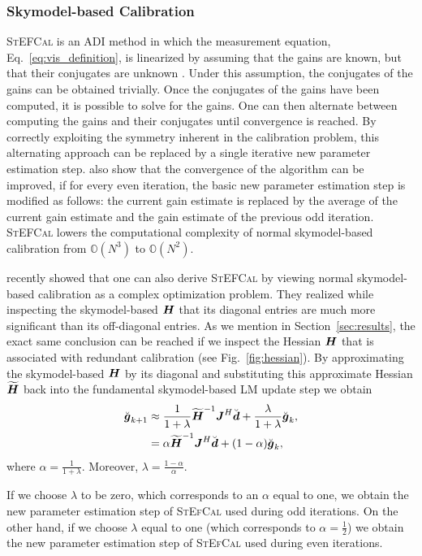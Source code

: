 \documentclass[useAMS,usenatbib]{mn2e}
\newcommand{\bg}{\bmath{g}}
\newcommand{\bd}{\bmath{d}}
\newcommand{\bJ}{\bmath{J}}
\newcommand{\bH}{\bmath{H}}
\begin{document}
\subsubsection{Skymodel-based Calibration}
\label{sec:sbc}
\textsc{StEFCal} is an ADI method in which the measurement equation, Eq.~\eqref{eq:vis_definition}, is linearized by assuming that the gains are known, but
that their conjugates are unknown \citep{Mitchell:MWA-cal,Salvini2014}. Under this assumption, the conjugates of the gains can be obtained trivially. Once the conjugates of the gains have been computed, it is possible to solve for the gains. One can then alternate between computing the gains and their conjugates until convergence
is reached. By correctly exploiting the symmetry inherent in the calibration problem, this alternating approach can be replaced by a single iterative new parameter estimation step. \cite{Salvini2014} also show that
the convergence of the algorithm can be improved, if for every even iteration, the basic new parameter estimation step is modified as follows: the current gain estimate is replaced by the average of the current gain estimate and the gain estimate of the previous odd iteration.
\textsc{StEFCal} lowers the computational complexity of normal skymodel-based calibration from $\mathbb{O}(N^3)$ to $\mathbb{O}(N^2)$. 

\citet{Smirnov2015} recently showed that one can also derive \textsc{StEFCal} by viewing normal skymodel-based calibration as a complex optimization problem.
They realized while inspecting the skymodel-based $\bH$ that its diagonal entries are much more significant than its off-diagonal entries.
As we mention in Section~\ref{sec:results}, the exact same conclusion can be reached if we inspect the Hessian $\bH$ that is associated with redundant calibration (see Fig.~\ref{fig:hessian}). 
By approximating the skymodel-based $\bH$ by its diagonal and substituting this approximate Hessian $\widetilde{\bH}$ back into the fundamental skymodel-based LM update step we obtain \citep{Smirnov2015} 
\begin{align}
\breve{\bg}_{k+1} &\approx \frac{1}{1+\lambda}\widetilde{\bH}^{-1}\bJ^H\breve{\bd} + \frac{\lambda}{1+\lambda} \breve{\bg}_k,\label{eq:stef_lambda}\\
 &= \alpha \widetilde{\bH}^{-1}\bJ^H\breve{\bd} + (1-\alpha)\breve{\bg}_k, \label{eq:stef_alpha}  
\end{align}
where $\alpha = \frac{1}{1+\lambda}$. Moreover, $\lambda = \frac{1-\alpha}{\alpha}$.

If we choose $\lambda$ to be zero, which corresponds to an $\alpha$ equal to one, we obtain the new parameter estimation step of \textsc{StEfCal} used during odd iterations. On the other hand, if we choose $\lambda$ equal to one (which corresponds
to $\alpha=\frac{1}{2}$) we obtain the new parameter estimation step of \textsc{StEfCal} used during even iterations. 
\end{document}
